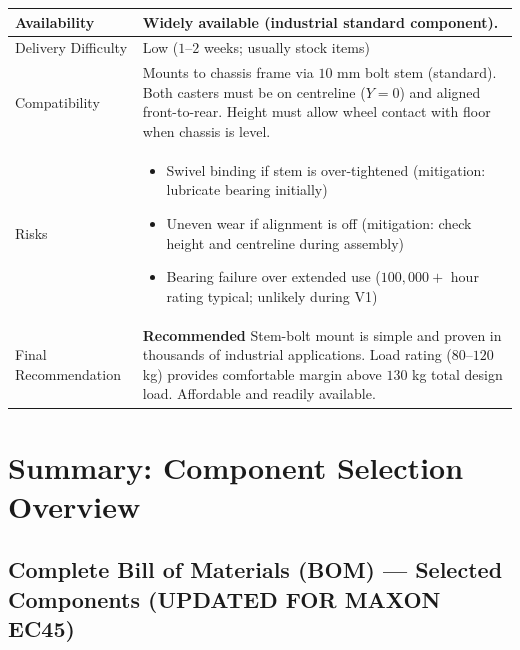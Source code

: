 \documentclass[12pt,a4paper]{article}
\begin{document}
\begin{longtable}{|p{4cm}|p{10cm}|}
Availability &
Widely available (industrial standard component). \\
\hline

Delivery Difficulty &
Low ($1$--$2$ weeks; usually stock items) \\
\hline

Compatibility &
Mounts to chassis frame via $10$ mm bolt stem (standard). Both casters must be on centreline ($Y = 0$) and aligned front-to-rear. Height must allow wheel contact with floor when chassis is level. \\
\hline

Risks &
\begin{itemize}
\item Swivel binding if stem is over-tightened (mitigation: lubricate bearing initially)
\item Uneven wear if alignment is off (mitigation: check height and centreline during assembly)
\item Bearing failure over extended use ($100,000+$ hour rating typical; unlikely during V1)
\end{itemize}
\\
\hline

Final Recommendation &
\textbf{Recommended} Stem-bolt mount is simple and proven in thousands of industrial applications. Load rating ($80$--$120$ kg) provides comfortable margin above $130$ kg total design load. Affordable and readily available. \\
\hline

\end{longtable}

\newpage
\section{Summary: Component Selection Overview}

\subsection{Complete Bill of Materials (BOM) --- Selected Components (UPDATED FOR MAXON EC45)}
\end{document}
